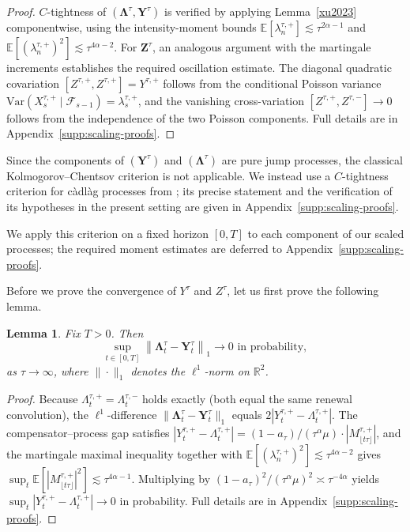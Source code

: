 \documentclass[letterpaper]{article}
\numberwithin{equation}{section}
\newtheorem{lemma}[theorem]{Lemma}
\theoremstyle{definition}
\theoremstyle{remark}
\begin{document}
\begin{proof}
{$C$-tightness of $(\boldsymbol\Lambda^\tau,\mathbf Y^\tau)$ is verified by applying Lemma~\ref{xu2023} componentwise, using the intensity-moment bounds $\mathbb{E}[\lambda_n^{\tau,+}]\lesssim\tau^{2\alpha-1}$ and $\mathbb{E}[(\lambda_n^{\tau,+})^2]\lesssim\tau^{4\alpha-2}$. For $\mathbf{Z}^\tau$, an analogous argument with the martingale increments establishes the required oscillation estimate.
The diagonal quadratic covariation $[Z^{\tau,+},Z^{\tau,+}]=Y^{\tau,+}$ follows from the conditional Poisson variance $\mathrm{Var}(X_s^{\tau,+}\mid\mathcal{F}_{s-1})=\lambda_s^{\tau,+}$, and the vanishing cross-variation $[Z^{\tau,+},Z^{\tau,-}]\to0$ follows from the independence of the two Poisson components.} Full details are in Appendix~\ref{supp:scaling-proofs}.
\end{proof}

Since the components of $(\mathbf Y^{\tau})$ and $(\boldsymbol\Lambda^{\tau})$ are pure jump processes, the classical Kolmogorov--Chentsov criterion is not applicable. We instead use a $C$-tightness criterion for c\`adl\`ag processes from \cite[Lemma 3.5]{horst2023convergence}; its precise statement and the verification of its hypotheses in the present setting are given in Appendix~\ref{supp:scaling-proofs}.

We apply this criterion on a fixed horizon $[0,T]$ to each component of our scaled processes; the required moment estimates are deferred to Appendix~\ref{supp:scaling-proofs}.

Before we prove the convergence of $Y^\tau$ and $Z^\tau$, let us first prove the following lemma.

\begin{lemma}\label{lem:tightness}
  Fix $T>0$. Then
  \[
  \sup_{t \in [0,T]} \left\|\boldsymbol{\Lambda}_t^\tau - \mathbf{Y}_t^\tau\right\|_1 \rightarrow 0 \text{ in probability},
  \]
as $\tau \rightarrow \infty$, where $\|\cdot\|_1$ denotes the $\ell^1$-norm on $\mathbb{R}^2$.
\end{lemma}

\begin{proof}
{Because $\Lambda_t^{\tau,+}=\Lambda_t^{\tau,-}$ holds exactly (both equal the same renewal convolution), the $\ell^1$-difference $\|\boldsymbol\Lambda_t^\tau-\mathbf{Y}_t^\tau\|_1$ equals $2|Y_t^{\tau,+}-\Lambda_t^{\tau,+}|$. The compensator--process gap satisfies $|Y_t^{\tau,+}-\Lambda_t^{\tau,+}|=(1-a_\tau)/(\tau^\alpha\mu)\cdot|M^{\tau,+}_{\lfloor t\tau\rfloor}|$, and the martingale maximal inequality together with $\mathbb{E}[(\lambda_n^{\tau,+})^2]\lesssim\tau^{4\alpha-2}$ gives $\sup_t\mathbb{E}[|M^{\tau,+}_{\lfloor t\tau\rfloor}|^2]\lesssim\tau^{4\alpha-1}$. Multiplying by $(1-a_\tau)^2/(\tau^\alpha\mu)^2\asymp\tau^{-4\alpha}$ yields $\sup_t|Y_t^{\tau,+}-\Lambda_t^{\tau,+}|\to0$ in probability.} Full details are in Appendix~\ref{supp:scaling-proofs}.
\end{proof}
\end{document}
